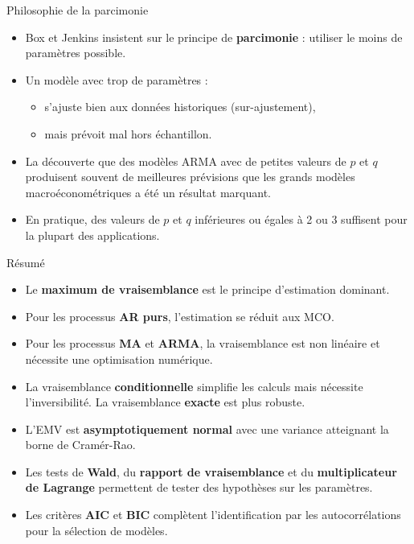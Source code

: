 \documentclass[11pt,aspectratio=169]{beamer}
\begin{document}
\begin{frame}{Philosophie de la parcimonie}

\begin{itemize}

\item Box et Jenkins insistent sur le principe de \textbf{parcimonie} : utiliser le moins de paramètres possible.\newline

\item Un modèle avec trop de paramètres :
  \begin{itemize}
    \item s'ajuste bien aux données historiques (sur-ajustement),
    \item mais prévoit mal hors échantillon.
  \end{itemize}

\item La découverte que des modèles ARMA avec de petites valeurs de $p$ et $q$ produisent souvent de meilleures prévisions que les grands modèles macroéconométriques a été un résultat marquant.\newline

\item En pratique, des valeurs de $p$ et $q$ inférieures ou égales à 2 ou 3 suffisent pour la plupart des applications.

\end{itemize}

\end{frame}

\begin{frame}{Résumé}

\begin{itemize}

\item Le \textbf{maximum de vraisemblance} est le principe d'estimation dominant.

\item Pour les processus \textbf{AR purs}, l'estimation se réduit aux MCO.

\item Pour les processus \textbf{MA} et \textbf{ARMA}, la vraisemblance est non linéaire et nécessite une optimisation numérique.

\item La vraisemblance \textbf{conditionnelle} simplifie les calculs mais nécessite l'inversibilité. La vraisemblance \textbf{exacte} est plus robuste.

\item L'EMV est \textbf{asymptotiquement normal} avec une variance atteignant la borne de Cramér-Rao.

\item Les tests de \textbf{Wald}, du \textbf{rapport de vraisemblance} et du \textbf{multiplicateur de Lagrange} permettent de tester des hypothèses sur les paramètres.

\item Les critères \textbf{AIC} et \textbf{BIC} complètent l'identification par les autocorrélations pour la sélection de modèles.

\end{itemize}

\end{frame}
\end{document}
